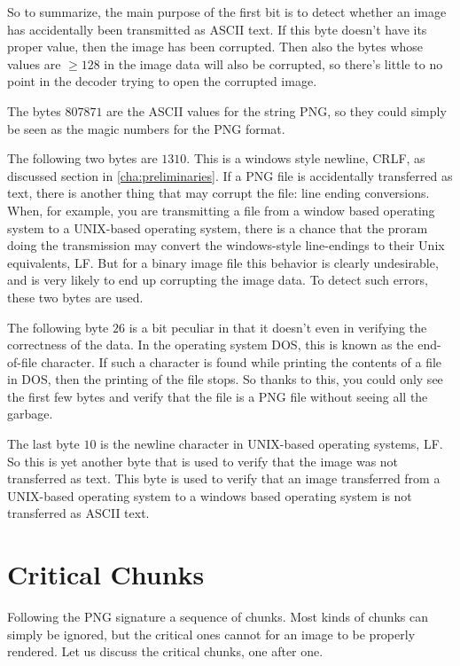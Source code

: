 So to summarize, the main purpose of the first bit is to detect
whether an image has accidentally been transmitted as ASCII text. If
this byte doesn't have its proper value, then the image has been
corrupted. Then also the bytes whose values are $\ge 128$ in the image
data will also be corrupted, so there's little to no point in the
decoder trying to open the corrupted image.

The bytes $80 78 71$ are the ASCII values for the string PNG, so they
could simply be seen as the magic numbers for the PNG format.

The following two bytes are $13 10$. This is a windows style newline,
CRLF, as discussed section in \ref{cha:preliminaries}. If a PNG
file is accidentally transferred as text, there is another thing that
may corrupt the file: line ending conversions. When, for example, you
are transmitting a file from a window based operating system to a
UNIX-based operating system, there is a chance that the proram doing
the transmission may convert the windows-style line-endings to their
Unix equivalents, LF. But for a binary image file this behavior is
clearly undesirable, and is very likely to end up corrupting the image
data. To detect such errors, these two bytes are used.

The following byte $26$ is a bit peculiar in that it doesn't even in
verifying the correctness of the data. In the operating system DOS,
this is known as the end-of-file character. If such a character is
found while printing the contents of a file in DOS, then the printing
of the file stops. So thanks to this, you could only see the first few
bytes and verify that the file is a PNG file without seeing all the
garbage. 

The last byte $10$ is the newline character in UNIX-based operating
systems, LF. So this is yet another byte that is used to verify that
the image was not transferred as text. This byte is used to verify
that an image transferred from a UNIX-based operating system to a
windows based operating system is not transferred as ASCII text.

\section{Critical Chunks}

Following the PNG signature a sequence of chunks. Most kinds of chunks
can simply be ignored, but the critical ones cannot for an image to be
properly rendered. Let us discuss the critical chunks, one after one.

